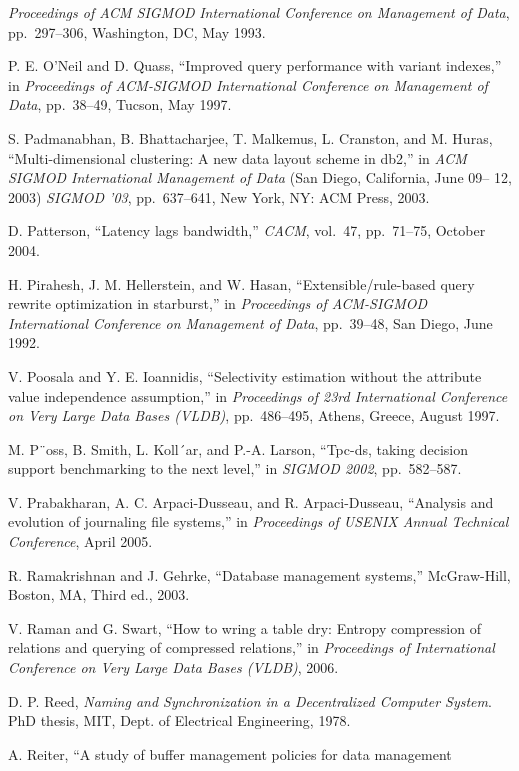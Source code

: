 \documentclass[a4paper,11pt,twoside,openright]{book}
\begin{document}
\begin{enumerate}[label={[\arabic*]}]
  \emph{Proceedings of ACM SIGMOD} \emph{International Conference on
  Management of Data}, pp.~297--306, Washington, DC, May 1993.
\item
  P. E. O'Neil and D. Quass, ``Improved query performance with variant
  indexes,'' in \emph{Proceedings of ACM-SIGMOD International Conference
  on Management of} \emph{Data}, pp.~38--49, Tucson, May 1997.
\item
  S. Padmanabhan, B. Bhattacharjee, T. Malkemus, L. Cranston, and M.
  Huras, ``Multi-dimensional clustering: A new data layout scheme in
  db2,'' in \emph{ACM} \emph{SIGMOD International Management of Data}
  (San Diego, California, June 09-- 12, 2003) \emph{SIGMOD '03},
  pp.~637--641, New York, NY: ACM Press, 2003.
\item
  D. Patterson, ``Latency lags bandwidth,'' \emph{CACM}, vol.~47,
  pp.~71--75, October 2004.
\item
  H. Pirahesh, J. M. Hellerstein, and W. Hasan, ``Extensible/rule-based
  query rewrite optimization in starburst,'' in \emph{Proceedings of
  ACM-SIGMOD International Conference on Management of Data},
  pp.~39--48, San Diego, June 1992.
\item
  V. Poosala and Y. E. Ioannidis, ``Selectivity estimation without the
  attribute value independence assumption,'' in \emph{Proceedings of
  23rd International Conference on Very Large Data Bases (VLDB)},
  pp.~486--495, Athens, Greece, August 1997.
\item
  M. P¨oss, B. Smith, L. Koll´ar, and P.-A. Larson, ``Tpc-ds,
taking decision support benchmarking to the next level,'' in
\emph{SIGMOD 2002}, pp.~582--587.
\item
  V. Prabakharan, A. C. Arpaci-Dusseau, and R. Arpaci-Dusseau,
``Analysis and evolution of journaling file systems,'' in
\emph{Proceedings of USENIX Annual Technical Conference}, April 2005.
\item
  R. Ramakrishnan and J. Gehrke, ``Database management systems,''
  McGraw-Hill, Boston, MA, Third ed., 2003.
\item
  V. Raman and G. Swart, ``How to wring a table dry: Entropy compression
  of relations and querying of compressed relations,'' in
  \emph{Proceedings of International} \emph{Conference on Very Large
  Data Bases (VLDB)}, 2006.
\item
  D. P. Reed, \emph{Naming and Synchronization in a Decentralized
  Computer System}. PhD thesis, MIT, Dept. of Electrical Engineering,
  1978.
\item
  A. Reiter, ``A study of buffer management policies for data management

\end{enumerate}
\end{document}

